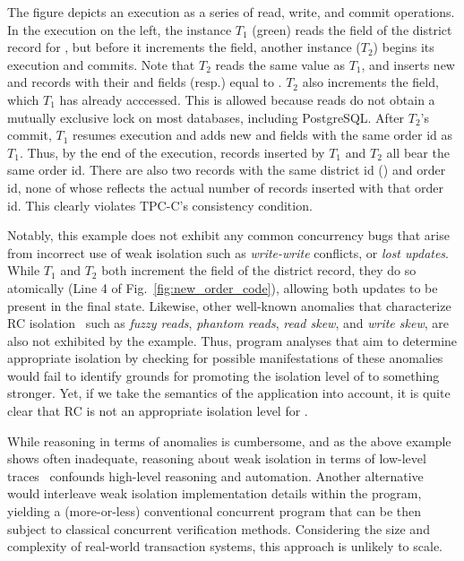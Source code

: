 The figure depicts an execution as a series of read, write, and commit
operations. In the execution on the left, the  instance
$T_1$ (green) reads the  field of the district
record for , but before it increments the field, another
 instance ($T_2$) begins its execution and commits. Note
that $T_2$ reads the same  value as $T_1$, and
inserts new  and  records with their 
and  fields (resp.) equal to . $T_2$
also increments the  field, which $T_1$ has already
acccessed. This is allowed because reads do not obtain a mutually
exclusive lock on most databases, including PostgreSQL. After $T_2$'s
commit, $T_1$ resumes execution and adds new  and
 fields with the same order id as $T_1$. Thus, by the
end of the execution,  records inserted by $T_1$ and
$T_2$ all bear the same order id. There are also two  records
with the same district id () and order id, none of whose
 reflects the actual number of  records
inserted with that order id.  This clearly violates TPC-C's consistency
condition.

Notably, this example does not exhibit any common concurrency bugs
that arise from incorrect use of weak isolation such as
\emph{write-write} conflicts, or \emph{lost updates}.  While $T_1$ and
$T_2$ both increment the  field of the district
record, they do so atomically (Line 4 of
Fig.~\ref{fig:new_order_code}), allowing both updates to be present in
the final state. Likewise, other well-known anomalies that
characterize RC isolation~\cite{berenson} such as \emph{fuzzy reads},
\emph{phantom reads}, \emph{read skew}, and \emph{write skew}, are
also not exhibited by the example.  Thus, program analyses that aim to
determine appropriate isolation by checking for possible
manifestations of these anomalies would fail to identify grounds for
promoting the isolation level of  to something stronger.
Yet, if we take the semantics of the application into account, it is
quite clear that RC is not an appropriate isolation level for
.

While reasoning in terms of anomalies is cumbersome, and as the above
example shows often inadequate, reasoning about weak isolation in
terms of low-level traces~\cite{adyaphd,gotsmanconcur15} confounds
high-level reasoning and automation.  Another alternative would
interleave weak isolation implementation details within the program,
yielding a (more-or-less) conventional concurrent program that can be
then subject to classical concurrent verification methods.
Considering the size and complexity of real-world transaction systems,
this approach is unlikely to scale.

